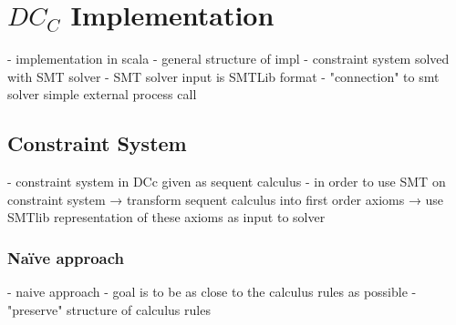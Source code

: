 \chapter{$DC_C$ Implementation}
- implementation in scala
- general structure of impl
  - constraint system solved with SMT solver
  - SMT solver input is SMTLib format
  - "connection" to smt solver simple external process call

\section{Constraint System}
- constraint system in DCc given as sequent calculus
- in order to use SMT on constraint system
  → transform sequent calculus into first order axioms
  → use SMTlib representation of these axioms as input to solver
\subsection{Na\"ive approach}
- naive approach
- goal is to be as close to the calculus rules as possible
- "preserve" structure of calculus rules

